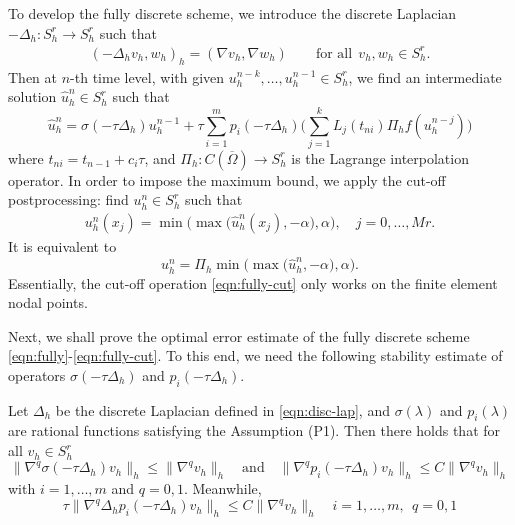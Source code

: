To develop the fully discrete scheme, we introduce the discrete Laplacian $-\Delta_h: S_h^r\rightarrow S_h^r$ such that
\begin{align}\label{eqn:disc-lap}
(-\Delta_h v_h, w_h)_h = (\nabla v_h, \nabla w_h)\qquad \text{for all} ~~v_h,w_h\in S_h^r.
\end{align}
Then at $n$-th time level, with given $u_h^{n-k}, \ldots, u_h^{n-1} \in S_h^r$, we find an intermediate solution
$\hat u_h^n\in S_h^r$ such that
\begin{equation}\label{eqn:fully}
 \hat u_h^n = \sigma(-\tau \Delta_h) u_h^{n-1} +\tau  \sum_{i=1}^m p_i(-\tau \Delta_h)
 \Big(\sum_{j=1}^{k} L_j (t_{ni}) \Pi_h f(u_h^{n-j})\Big)
\end{equation}
where $t_{ni}=t_{n-1}+c_i\tau$, and $\Pi_h:C(\overline\Omega)\rightarrow S_h^r$ is the Lagrange interpolation operator.
In order to impose the maximum bound, we apply the cut-off postprocessing: find $u_h^n \in S_h^r$ such that
\begin{equation}\label{eqn:fully-cut}
\begin{split}
u_h^n(x_j)  = \min\big(\max \big(\hat u_h^n(x_j), - \alpha \big) , \alpha \big),  \quad j=0,\dots,Mr.
\end{split}
\end{equation}
It is equivalent to
\begin{equation*}
u_h^n  = \Pi_h \min\big(\max \big(\hat u_h^n, - \alpha \big) , \alpha \big) .
\end{equation*}
Essentially, the cut-off operation \eqref{eqn:fully-cut} only works on the finite element nodal points.


Next, we shall prove the optimal error estimate of the fully discrete scheme \eqref{eqn:fully}-\eqref{eqn:fully-cut}.
To this end, we need the following stability estimate of operators $\sigma(-\tau \Delta_h)$ and $p_i(-\tau \Delta_h) $.
\begin{lemma}\label{lem:stable-fully}
Let $\Delta_h$ be the discrete Laplacian defined in \eqref{eqn:disc-lap}, and $\sigma(\lambda)$ and $p_i(\lambda)$ are
rational functions satisfying the Assumption (P1). Then there holds that for all $v_h \in S_h^r$
\begin{equation}\label{eqn:stab-est-1}
 \|  \nabla^q \sigma(-\tau \Delta_h) v_h \|_h \le \| \nabla^q v_h \|_h
\quad \text{and}\quad \|  \nabla^q p_i(-\tau \Delta_h ) v_h \|_h \le C\| \nabla^q v_h \|_h
 \end{equation}
 with $i=1,\ldots,m$ and $q=0,1$.
 Meanwhile,
\begin{equation} \label{eqn:stab-est-2}
 \tau \|  \nabla^q \Delta_h p_i (-\tau \Delta_h) v_h \|_h   \le C \|  \nabla^q v_h \|_h
 \quad  i=1,\ldots,m, ~~q=0,1
  \end{equation}
\end{lemma}

